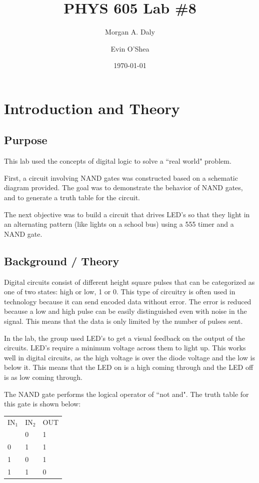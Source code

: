 \documentclass[twocolumn, amsmath]{revtex4}
\begin{document}
\title{PHYS 605 Lab \#8} 

\author{Morgan A. Daly}
\author{Evin O'Shea}
\date{\today} 


\maketitle


\section{Introduction and Theory}
\subsection{Purpose}

This lab used the concepts of digital logic to solve a ``real world" problem.

First, a circuit involving NAND gates was constructed based on a schematic diagram provided. The goal was to demonstrate the behavior of NAND gates, and to generate a truth table for the circuit.

The next objective was to build a circuit that drives LED's so that they light in an alternating pattern (like lights on a school bus) using a 555 timer and a NAND gate.


\subsection{Background / Theory}

Digital circuits consist of different height square pulses that can be categorized as one of two states: high or low, 1 or 0. This type of circuitry is often used in technology because it can send encoded data without error. The error is reduced because a low and high pulse can be easily distinguished even with noise in the signal. This means that the data is only limited by the number of pulses sent.

In the lab, the group used LED's to get a visual feedback on the output of the circuits. 
LED's require a minimum voltage across them to light up. This works well in digital circuits, as the high voltage is over the diode voltage and the low is below it. This means that the LED on is a high coming through and the LED off is as low coming through.

The NAND gate performs the logical operator of ``not and". The truth table for this gate is shown below:

\begin{center}
	\begin{ruledtabular}
    \begin{tabular}{ l l l}
	IN$_1$ & IN$_2$ & OUT\\ \colrule
	0 & 0 & 1 \\
	0 & 1 & 1 \\
	1 & 0 & 1 \\
	1 & 1 & 0  \\
\end{tabular}
    \end{ruledtabular}
\end{center}
\end{document}
